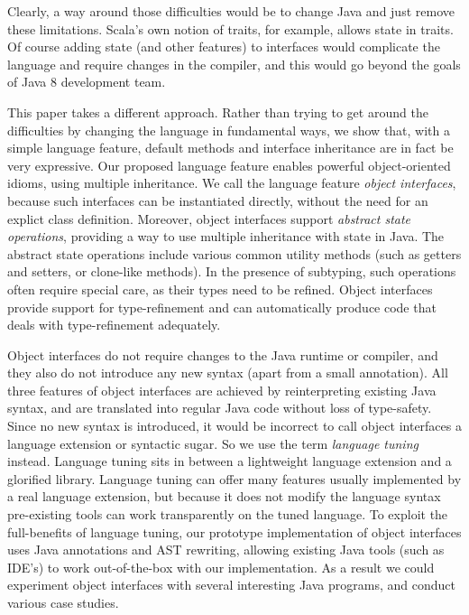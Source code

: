 \noindent Clearly, a way around those difficulties would be to
change Java and just remove these limitations. Scala's own
notion of traits, for example, allows state in traits. Of course adding
state (and other features) to interfaces would complicate the language
and require changes in the compiler, and this would go beyond the
goals of Java 8 development team.

This paper takes a different approach. Rather than trying to get
around the difficulties by changing the language in fundamental ways,
we show that, with a simple language feature, default methods and
interface inheritance are in fact be very expressive. Our proposed
language feature enables powerful object-oriented idioms, using
multiple inheritance. We call the language feature \emph{object
  interfaces}, because such interfaces can be instantiated directly,
without the need for an explict class definition. Moreover, object
interfaces support \emph{abstract state operations}, providing a way
to use multiple inheritance with state in Java. The abstract state
operations include various common utility methods (such as getters and
setters, or clone-like methods). In the presence of subtyping, such
operations often require special care, as their types need to be
refined. Object interfaces provide support for type-refinement and can
automatically produce code that deals with type-refinement
adequately. %

Object interfaces do not require changes to the Java runtime or compiler, 
and they also do not introduce any new syntax (apart from a
small annotation). All three features of object interfaces are
achieved by reinterpreting existing Java syntax, and are translated
into regular Java code without loss of type-safety. Since no new
syntax is introduced, it would be incorrect to call object interfaces
a language extension or syntactic sugar. So we use the term
\emph{language tuning} instead. Language tuning sits in between a
lightweight language extension and a glorified library. Language
tuning can offer many features usually implemented by a real language
extension, but because it does not modify the language syntax
pre-existing tools can work transparently on the tuned language.  To
exploit the full-benefits of language tuning, our prototype
implementation of object interfaces uses Java annotations and AST
rewriting, allowing existing Java tools (such as IDE's) to work
out-of-the-box with our implementation. As a result we could
experiment object interfaces with several interesting Java programs,
and conduct various case studies.

